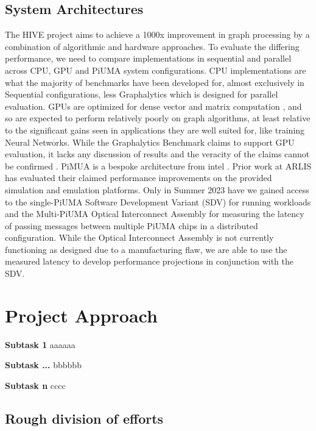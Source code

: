 \documentclass[letterpaper, 10pt]{article}
\begin{document}
\begin{multicols}{2}
        \subsection{System Architectures}
        The HIVE project aims to achieve a 1000x improvement in graph processing by a combination of algorithmic and hardware approaches. 
        To evaluate the differing performance, we need to compare implementations in sequential and parallel across CPU, GPU and PiUMA system configurations. 
        CPU implementations are what the majority of benchmarks have been developed for, almost exclusively in Sequential configurations, less Graphalytics \cite{Capota2015} which is designed for parallel evaluation. 
        GPUs are optimized for dense vector and matrix computation \cite{Dally2021}, and so are expected to perform relatively poorly on graph algorithms, at least relative to the significant gains seen in applications they are well suited for, like training Neural Networks. While the Graphalytics Benchmark claims to support GPU evaluation, it lacks any discussion of results and the veracity of the claims cannot be confirmed \cite{Capota2015}.
        PiMUA is a bespoke architecture from intel \cite{Aananthakrishnan2020}. 
        Prior work at ARLIS has evaluated their claimed performance improvements on the provided simulation and emulation platforms. 
        Only in Summer 2023 have we gained access to the single-PiUMA Software Development Variant (SDV) for running workloads and the Multi-PiUMA Optical Interconnect Assembly for measuring the latency of passing messages between multiple PiUMA chips in a distributed configuration. 
        While the Optical Interconnect Assembly is not currently functioning as designed due to a manufacturing flaw, we are able to use the measured latency to develop performance projections in conjunction with the SDV. 
        

    \section{Project Approach}
        \textbf{Subtask 1} aaaaaa
        
        \textbf{Subtask ...} bbbbbb
        
        \textbf{Subtask n} cccc

        \subsection{Rough division of efforts}
        

\end{multicols}
\end{document}

